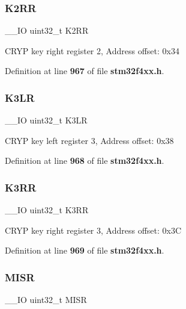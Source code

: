 \mbox{\label{structCRYP__TypeDef_a41a0448734e8ccbdd6fba98284815c6f}} 
\subsubsection{K2\+RR}
{\footnotesize\ttfamily \+\_\+\+\_\+\+IO uint32\+\_\+t K2\+RR}

C\+R\+YP key right register 2, Address offset\+: 0x34 

Definition at line \textbf{ 967} of file \textbf{ stm32f4xx.\+h}.

\mbox{\label{structCRYP__TypeDef_a516c328fcb53ec754384e584caf890f5}} 
\subsubsection{K3\+LR}
{\footnotesize\ttfamily \+\_\+\+\_\+\+IO uint32\+\_\+t K3\+LR}

C\+R\+YP key left register 3, Address offset\+: 0x38 

Definition at line \textbf{ 968} of file \textbf{ stm32f4xx.\+h}.

\mbox{\label{structCRYP__TypeDef_a8fe249258f1733ec155c3893375c7a21}} 
\subsubsection{K3\+RR}
{\footnotesize\ttfamily \+\_\+\+\_\+\+IO uint32\+\_\+t K3\+RR}

C\+R\+YP key right register 3, Address offset\+: 0x3C 

Definition at line \textbf{ 969} of file \textbf{ stm32f4xx.\+h}.

\mbox{\label{structCRYP__TypeDef_a524e134cec519206cb41d0545e382978}} 
\subsubsection{M\+I\+SR}
{\footnotesize\ttfamily \+\_\+\+\_\+\+IO uint32\+\_\+t M\+I\+SR}

